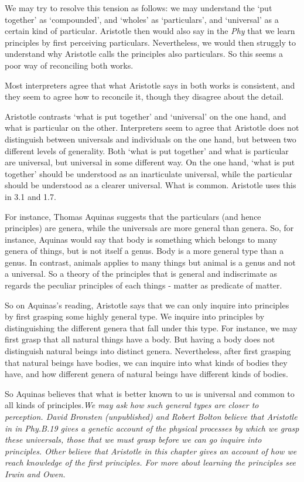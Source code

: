 \documentclass[10pt, oneside]{book}
\begin{document}
We may try to resolve this tension as follows: we may understand the `put together'  as `compounded', and `wholes' as `particulars', and `universal' as a certain kind of particular. Aristotle then would also say in the \emph{Phy} that we learn principles by first perceiving particulars. Nevertheless, we would then struggly to understand why Aristotle calls the principles also particulars.  So this seems a poor way of reconciling both works.

Most interpreters agree that what Aristotle says in both works is consistent, and they seem to agree how to reconcile it, though they disagree about the detail. 

Aristotle contrasts `what is put together' and `universal' on the one hand, and what is particular on the other. Interpreters seem to agree that Aristotle does not distinguish between universals and individuals on the one hand, but between two different levels of generality. Both `what is put together' and what is particular are universal, but universal in some different way. On the one hand, `what is put together' should be understood as an inarticulate universal, while the particular should be understood as a clearer universal. What is common. Aristotle uses this in 3.1 and 1.7.

For instance, Thomas Aquinas suggests that the particulars (and hence principles) are genera, while the universals are more general than genera. So, for instance, Aquinas would say that body is something which belongs to many genera of things, but is not itself a genus. Body is a more general type than a genus. In contrast, animals applies to many things but animal is a genus and not a universal. So a theory of the principles that is general and indiscrimate as regards the peculiar principles of each things - matter as predicate of matter.  

So on Aquinas's reading, Aristotle says that we can only inquire into principles by first grasping some highly general type. We inquire into principles by distinguishing the different genera that fall under this type. For instance, we may first grasp that all natural things have a body. But having a body does not distinguish natural beings into distinct genera. Nevertheless, after first grasping that natural beings have bodies, we can inquire into what kinds of bodies they have, and how different genera of natural beings have different kinds of bodies. 

So Aquinas believes that what is better known to us is universal and common to all kinds of principles.\emph{We may ask how such general types are closer to perception. David Bronsten (unpublished) and Robert Bolton believe that Aristotle in in \emph{Phy}.B.19 gives a genetic account of the physical processes by which we grasp these universals, those that we must grasp before we can go inquire into principles. Other believe that Aristotle in this chapter gives an account of how we reach knowledge of the first principles. For more about learning the principles see Irwin and Owen.}
\end{document}
